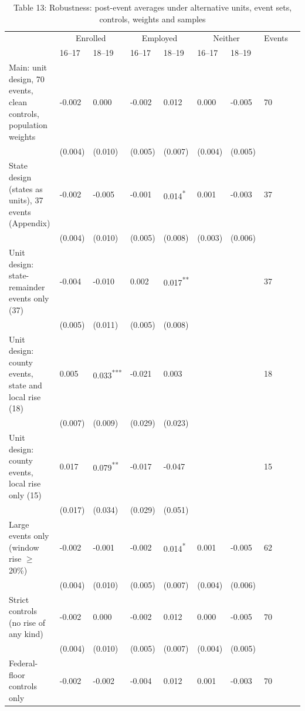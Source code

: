 \documentclass[12pt]{article}
\begin{document}
\begin{table}
\centering
\caption{Table 13: Robustness: post-event averages under alternative units, event sets, controls, weights and samples}

\footnotesize
\begin{tabular}{p{}p{}p{}p{}p{}p{}p{}p{}p{}}
\toprule
 & \multicolumn{2}{c}{Enrolled} & \multicolumn{2}{c}{Employed} & \multicolumn{2}{c}{Neither} & Events \\

 & 16--17 & 18--19 & 16--17 & 18--19 & 16--17 & 18--19 & \\
\midrule
Main: unit design, 70 events, clean controls, population weights & -0.002 & 0.000 & -0.002 & 0.012 & 0.000 & -0.005 & 70 \\
 & (0.004) & (0.010) & (0.005) & (0.007) & (0.004) & (0.005) &  \\
State design (states as units), 37 events (Appendix) & -0.002 & -0.005 & -0.001 & 0.014\textsuperscript{*} & 0.001 & -0.003 & 37 \\
 & (0.004) & (0.010) & (0.005) & (0.008) & (0.003) & (0.006) &  \\
Unit design: state-remainder events only (37) & -0.004 & -0.010 & 0.002 & 0.017\textsuperscript{**} &  &  & 37 \\
 & (0.005) & (0.011) & (0.005) & (0.008) &  &  &  \\
Unit design: county events, state and local rise (18) & 0.005 & 0.033\textsuperscript{***} & -0.021 & 0.003 &  &  & 18 \\
 & (0.007) & (0.009) & (0.029) & (0.023) &  &  &  \\
Unit design: county events, local rise only (15) & 0.017 & 0.079\textsuperscript{**} & -0.017 & -0.047 &  &  & 15 \\
 & (0.017) & (0.034) & (0.029) & (0.051) &  &  &  \\
Large events only (window rise $\geq$ 20\%) & -0.002 & -0.001 & -0.002 & 0.014\textsuperscript{*} & 0.001 & -0.005 & 62 \\
 & (0.004) & (0.010) & (0.005) & (0.007) & (0.004) & (0.006) &  \\
Strict controls (no rise of any kind) & -0.002 & 0.000 & -0.002 & 0.012 & 0.000 & -0.005 & 70 \\
 & (0.004) & (0.010) & (0.005) & (0.007) & (0.004) & (0.005) &  \\
Federal-floor controls only & -0.002 & -0.002 & -0.004 & 0.012 & 0.001 & -0.003 & 70 \\

\end{tabular}
\end{table}
\end{document}
